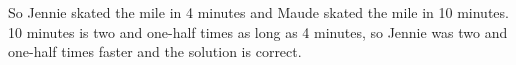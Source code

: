 \documentclass[fleqn,addpoints]{exam}
\begin{document}
\begin{questions}
\begin{solution}[5 cm]
So Jennie skated the mile in 4 minutes and Maude skated the mile in 10 minutes.  10 minutes is two and one-half times as
long as 4 minutes, so Jennie was two and one-half times faster and the solution is correct.

\end{solution}
\end{questions}
\end{document}
